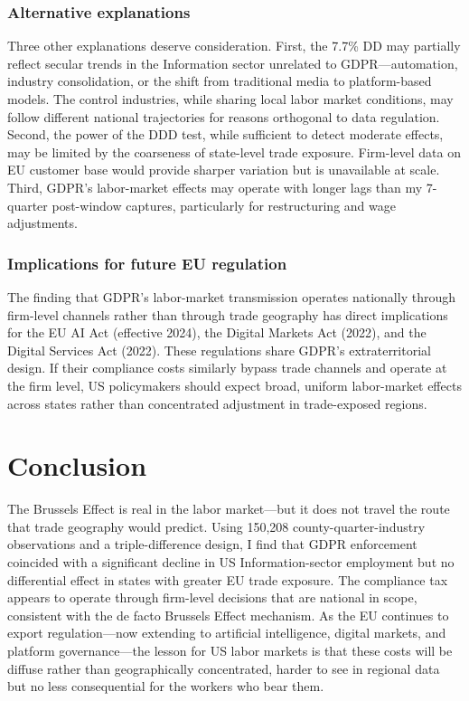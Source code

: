 \documentclass[12pt]{article}
\begin{document}
\subsubsection*{Alternative explanations} Three other explanations deserve consideration. First, the 7.7\% DD may partially reflect secular trends in the Information sector unrelated to GDPR---automation, industry consolidation, or the shift from traditional media to platform-based models. The control industries, while sharing local labor market conditions, may follow different national trajectories for reasons orthogonal to data regulation. Second, the power of the DDD test, while sufficient to detect moderate effects, may be limited by the coarseness of state-level trade exposure. Firm-level data on EU customer base would provide sharper variation but is unavailable at scale. Third, GDPR's labor-market effects may operate with longer lags than my 7-quarter post-window captures, particularly for restructuring and wage adjustments.

\subsubsection*{Implications for future EU regulation} The finding that GDPR's labor-market transmission operates nationally through firm-level channels rather than through trade geography has direct implications for the EU AI Act (effective 2024), the Digital Markets Act (2022), and the Digital Services Act (2022). These regulations share GDPR's extraterritorial design. If their compliance costs similarly bypass trade channels and operate at the firm level, US policymakers should expect broad, uniform labor-market effects across states rather than concentrated adjustment in trade-exposed regions.

\section{Conclusion}

The Brussels Effect is real in the labor market---but it does not travel the route that trade geography would predict. Using 150,208 county-quarter-industry observations and a triple-difference design, I find that GDPR enforcement coincided with a significant decline in US Information-sector employment but no differential effect in states with greater EU trade exposure. The compliance tax appears to operate through firm-level decisions that are national in scope, consistent with the de facto Brussels Effect mechanism. As the EU continues to export regulation---now extending to artificial intelligence, digital markets, and platform governance---the lesson for US labor markets is that these costs will be diffuse rather than geographically concentrated, harder to see in regional data but no less consequential for the workers who bear them.
\end{document}
